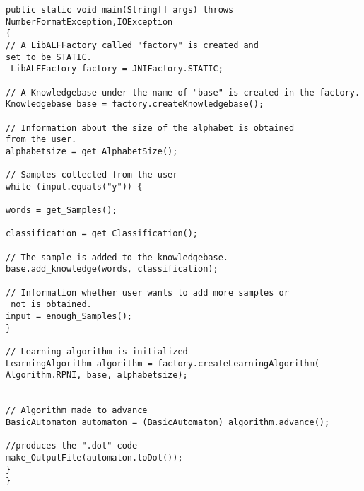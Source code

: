 \lstset{language=java, numbers=left, numberstyle=\tiny, stepnumber=1, numbersep=5pt}
\begin{lstlisting}[frame=single]
public static void main(String[] args) throws 
NumberFormatException,IOException 
{
// A LibALFFactory called "factory" is created and 
set to be STATIC.
 LibALFFactory factory = JNIFactory.STATIC;

// A Knowledgebase under the name of "base" is created in the factory.
Knowledgebase base = factory.createKnowledgebase();

// Information about the size of the alphabet is obtained 
from the user.
alphabetsize = get_AlphabetSize();

// Samples collected from the user
while (input.equals("y")) {

words = get_Samples(); 

classification = get_Classification(); 

// The sample is added to the knowledgebase.
base.add_knowledge(words, classification); 

// Information whether user wants to add more samples or
 not is obtained.
input = enough_Samples();
}

// Learning algorithm is initialized 
LearningAlgorithm algorithm = factory.createLearningAlgorithm(
Algorithm.RPNI, base, alphabetsize);


// Algorithm made to advance
BasicAutomaton automaton = (BasicAutomaton) algorithm.advance();

//produces the ".dot" code
make_OutputFile(automaton.toDot());
}
}
\end{lstlisting}

